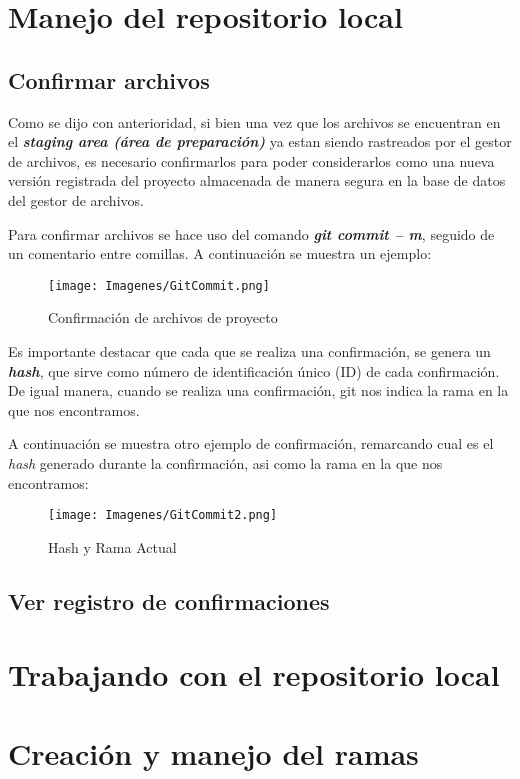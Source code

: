 \section{Manejo del repositorio local}

\subsection{Confirmar archivos}

Como se dijo con anterioridad, si bien una vez que los archivos se encuentran en el \textbf{\textit{staging area (área de preparación)}} ya estan siendo rastreados por el gestor de archivos, es necesario confirmarlos para poder considerarlos como una nueva versión registrada del proyecto almacenada de manera segura en la base de datos del gestor de archivos.

Para confirmar archivos se hace uso del comando \textbf{\textit{git commit – m}}, seguido de un comentario entre comillas. A continuación se muestra un ejemplo:

    \begin{figure}[H]
        \centering
        \texttt{[image: Imagenes/GitCommit.png]}
        \caption{Confirmación de archivos de proyecto}
        \label{}
    \end{figure}

Es importante destacar que cada que se realiza una confirmación, se genera un \textbf{\textit{hash}}, que sirve como número de identificación único (ID) de cada confirmación. De igual manera, cuando se realiza una confirmación, git nos indica la rama en la que nos encontramos.

A continuación se muestra otro ejemplo de confirmación, remarcando cual es el \emph{hash} generado durante la confirmación, asi como la rama en la que nos encontramos:

\begin{figure}[H]
        \centering
        \texttt{[image: Imagenes/GitCommit2.png]}
        \caption{Hash y Rama Actual}
        \label{}
    \end{figure}

\subsection{Ver registro de confirmaciones}

\section{Trabajando con el repositorio local}

\section{Creación y manejo del ramas}